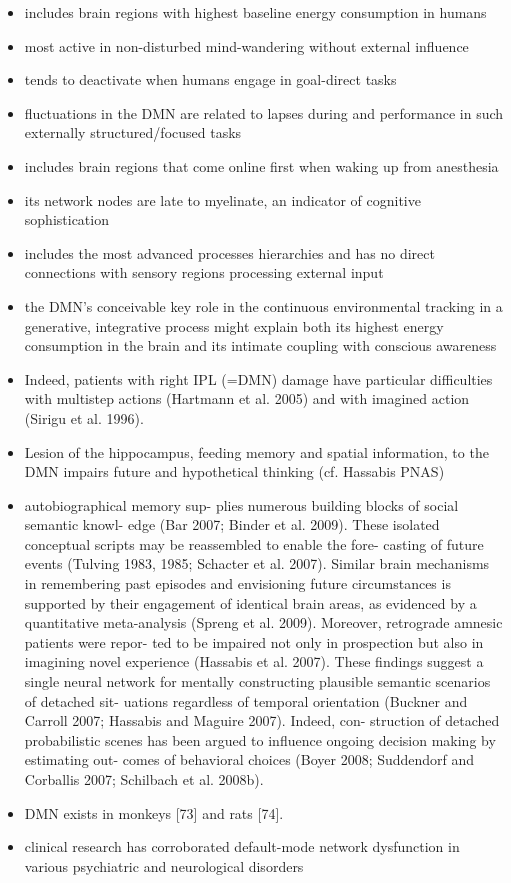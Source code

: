 \documentclass{article} %
\begin{document}
\begin{itemize}
  \item includes brain regions with highest baseline energy consumption in humans
  \item most active in non-disturbed mind-wandering without external influence
  \item tends to deactivate when humans engage in goal-direct tasks
  \item fluctuations in the DMN are related to lapses during and performance in
  such externally structured/focused tasks
  \item includes brain regions that come online first when waking up from
  anesthesia
  \item its network nodes are late to myelinate, an indicator of cognitive sophistication
  \item includes the most advanced processes hierarchies and has
  no direct connections with sensory regions processing external input
  \item the DMN's conceivable key role in the continuous environmental
  tracking in a generative, integrative process might explain both its highest energy consumption in the brain and its intimate coupling with conscious awareness
  \item Indeed, patients with right IPL (=DMN) damage have particular difficulties
  with multistep actions (Hartmann et al. 2005)
  and with imagined action (Sirigu et al. 1996).
  \item Lesion of the hippocampus, feeding memory and spatial information, to the
  DMN impairs future and hypothetical thinking (cf. Hassabis PNAS)

  \item
  autobiographical memory sup- plies numerous building blocks of social semantic knowl- edge (Bar 2007; Binder et al. 2009). These isolated conceptual scripts may be reassembled to enable the fore- casting of future events (Tulving 1983, 1985; Schacter et al. 2007). Similar brain mechanisms in remembering past episodes and envisioning future circumstances is supported by their engagement of identical brain areas, as evidenced by a quantitative meta-analysis (Spreng et al. 2009). Moreover, retrograde amnesic patients were repor- ted to be impaired not only in prospection but also in imagining novel experience (Hassabis et al. 2007). These findings suggest a single neural network for mentally constructing plausible semantic scenarios of detached sit- uations regardless of temporal orientation (Buckner and Carroll 2007; Hassabis and Maguire 2007). Indeed, con- struction of detached probabilistic scenes has been argued to influence ongoing decision making by estimating out- comes of behavioral choices (Boyer 2008; Suddendorf and Corballis 2007; Schilbach et al. 2008b). 
  \item
  DMN exists in monkeys [73] and rats [74]. 
  \item clinical research has corroborated default-mode network dysfunction in various psychiatric and neurological disorders
\end{itemize}
\end{document}
